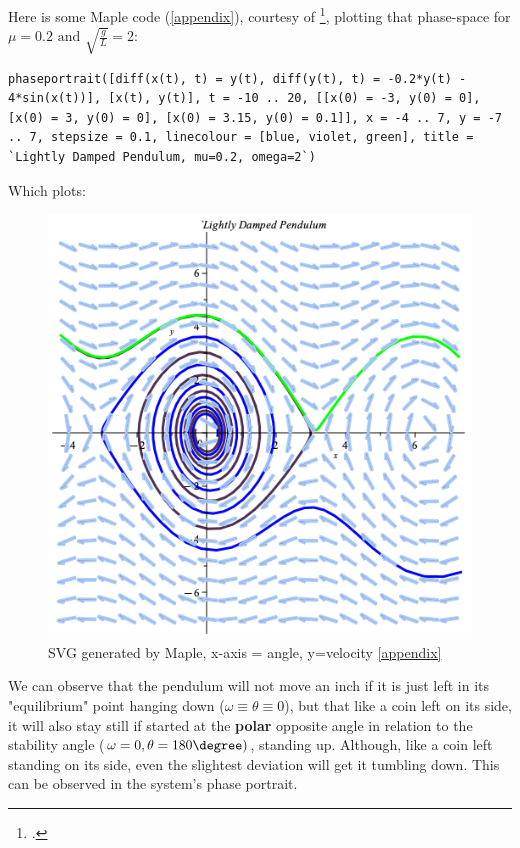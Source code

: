 Here is some Maple code (\ref{appendix}), courtesy of   \footcite{georgePendulumDemo}, plotting that phase-space for $\mu =0.2 \text{ and } \sqrt{\frac{g}{L}} = 2$:
\begin{verbatim}
phaseportrait([diff(x(t), t) = y(t), diff(y(t), t) = -0.2*y(t) - 4*sin(x(t))], [x(t), y(t)], t = -10 .. 20, [[x(0) = -3, y(0) = 0], [x(0) = 3, y(0) = 0], [x(0) = 3.15, y(0) = 0.1]], x = -4 .. 7, y = -7 .. 7, stepsize = 0.1, linecolour = [blue, violet, green], title = `Lightly Damped Pendulum, mu=0.2, omega=2`)
\end{verbatim}

Which plots:

\begin{figure}[H]
\centering
\includegraphics[width=\textwidth-7cm]{math_pics/damped-pendulum.png}
\caption{SVG generated by Maple, x-axis = angle, y=velocity \ref{appendix}}
\label{fig:damped-pendulum}
\end{figure}

We can observe that the pendulum will not move an inch if it is just left in its "equilibrium" point hanging down ($\omega \equiv \theta \equiv 0$), but that like a coin left on its side, it will also stay still if started at the \textbf{polar} opposite angle in relation to the stability angle ($\omega =0 , \theta = 180 \degree)$, standing up.
Although, like a coin left standing on its side, even the slightest deviation will get it tumbling down. This can be observed in the system's phase portrait.


